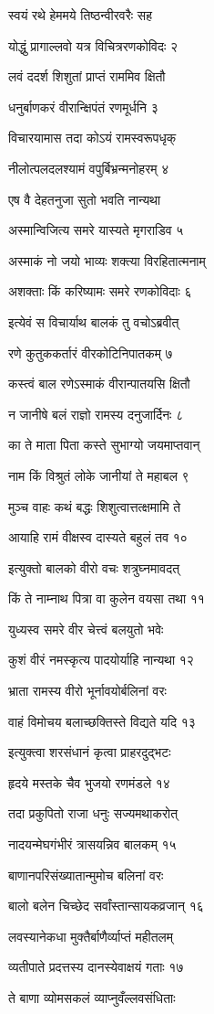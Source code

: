 स्वयं रथे हेममये तिष्ठन्वीरवरैः सह

योद्धुं प्रागाल्लवो यत्र विचित्ररणकोविदः २

लवं ददर्श शिशुतां प्राप्तं राममिव क्षितौ

धनुर्बाणकरं वीरान्क्षिपंतं रणमूर्धनि ३

विचारयामास तदा कोऽयं रामस्वरूपधृक्

नीलोत्पलदलश्यामं वपुर्बिभ्रन्मनोहरम् ४

एष वै देहतनुजा सुतो भवति नान्यथा

अस्मान्विजित्य समरे यास्यते मृगराडिव ५

अस्माकं नो जयो भाव्यः शक्त्या विरहितात्मनाम्

अशक्ताः किं करिष्यामः समरे रणकोविदाः ६

इत्येवं स विचार्याथ बालकं तु वचोऽब्रवीत्

रणे कुतुककर्तारं वीरकोटिनिपातकम् ७

कस्त्वं बाल रणेऽस्माकं वीरान्पातयसि क्षितौ

न जानीषे बलं राज्ञो रामस्य दनुजार्दिनः ८

का ते माता पिता कस्ते सुभाग्यो जयमाप्तवान्

नाम किं विश्रुतं लोके जानीयां ते महाबल ९

मुञ्च वाहः कथं बद्धः शिशुत्वात्तत्क्षमामि ते

आयाहि रामं वीक्षस्व दास्यते बहुलं तव १०

इत्युक्तो बालको वीरो वचः शत्रुघ्नमावदत्

किं ते नाम्नाथ पित्रा वा कुलेन वयसा तथा ११

युध्यस्व समरे वीर चेत्त्वं बलयुतो भवेः

कुशं वीरं नमस्कृत्य पादयोर्याहि नान्यथा १२

भ्राता रामस्य वीरो भूर्नावयोर्बलिनां वरः

वाहं विमोचय बलाच्छक्तिस्ते विद्यते यदि १३

इत्युक्त्वा शरसंधानं कृत्वा प्राहरदुद्भटः

हृदये मस्तके चैव भुजयो रणमंडले १४

तदा प्रकुपितो राजा धनुः सज्यमथाकरोत्

नादयन्मेघगंभीरं त्रासयन्निव बालकम् १५

बाणानपरिसंख्यातान्मुमोच बलिनां वरः

बालो बलेन चिच्छेद सर्वांस्तान्सायकव्रजान् १६

लवस्यानेकधा मुक्तैर्बाणैर्व्याप्तं महीतलम्

व्यतीपाते प्रदत्तस्य दानस्येवाक्षयं गताः १७

ते बाणा व्योमसकलं व्याप्नुवँल्लवसंधिताः

